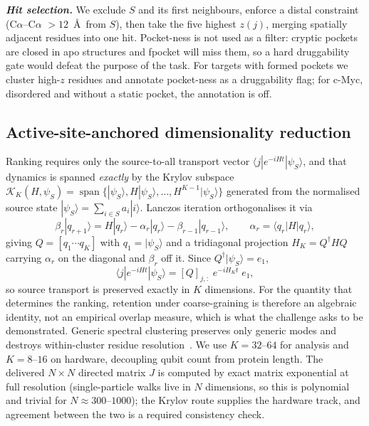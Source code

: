 \documentclass[10pt,a4paper]{article}
\newcommand{\lead}[1]{\textbf{\textit{#1}}}
\begin{document}
\lead{Hit selection.} We exclude $S$ and its first neighbours, enforce a distal constraint
(C$\alpha$--C$\alpha$ $> 12$~\AA\ from $S$), then take the five highest $z(j)$, merging spatially
adjacent residues into one hit. Pocket-ness is not used as a filter: cryptic pockets are closed in apo structures and fpocket will
miss them, so a hard druggability gate would defeat the purpose of the task. For targets with formed pockets we cluster high-$z$ residues and annotate pocket-ness as
a druggability flag; for c-Myc, disordered and without a static pocket, the annotation is off.

\subsection{Active-site-anchored dimensionality reduction}

Ranking requires only the source-to-all transport vector $\langle j|e^{-iHt}|\psi_S\rangle$, and
that dynamics is spanned \emph{exactly} by the Krylov subspace $\mathcal{K}_K(H,\psi_S) =
\operatorname{span}\{|\psi_S\rangle, H|\psi_S\rangle, \dots, H^{K-1}|\psi_S\rangle\}$ generated from
the normalised source state $|\psi_S\rangle = \sum_{i \in S} a_i |i\rangle$. Lanczos iteration
orthogonalises it via
\begin{equation}
\beta_r |q_{r+1}\rangle = H|q_r\rangle - \alpha_r |q_r\rangle - \beta_{r-1}|q_{r-1}\rangle,
\qquad \alpha_r = \langle q_r | H | q_r \rangle,
\end{equation}
giving $Q = [q_1 \cdots q_K]$ with $q_1 = |\psi_S\rangle$ and a tridiagonal projection
$H_K = Q^{\dagger} H Q$ carrying $\alpha_r$ on the diagonal and $\beta_r$ off it. Since
$Q^{\dagger}|\psi_S\rangle = e_1$,
\begin{equation}
\langle j|e^{-iHt}|\psi_S\rangle = [Q]_{j,:}\; e^{-iH_K t}\; e_1 ,
\end{equation}
so source transport is preserved exactly in $K$ dimensions. For the quantity that determines the
ranking, retention under coarse-graining is therefore an algebraic identity, not an empirical overlap
measure, which is what the challenge asks to be demonstrated. Generic spectral clustering
preserves only generic modes and destroys within-cluster residue resolution~\cite{novo2015}. We use $K = 32$--$64$ for analysis and
$K = 8$--$16$ on hardware, decoupling qubit count from protein length. The delivered $N \times N$
directed matrix $J$ is computed by exact matrix exponential at full resolution (single-particle walks
live in $N$ dimensions, so this is polynomial and trivial for $N \approx 300$--$1000$); the Krylov
route supplies the hardware track, and agreement between the two is a required consistency check.
\end{document}
